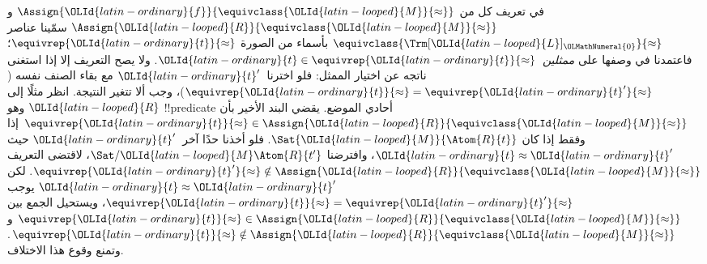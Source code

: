 \documentclass[../../../include/open-logic-section]{subfiles}
\begin{document}
\begin{explain}
في تعريف كل من $\Assign{\OLId{latin-ordinary}{f}}{\equivclass{\OLId{latin-looped}{M}}{\approx}}$ و
$\Assign{\OLId{latin-looped}{R}}{\equivclass{\OLId{latin-looped}{M}}{\approx}}$ سمّينا عناصر
$\equivclass{\Trm[\OLId{latin-looped}{L}]_\OLMathNumeral{0}}{\approx}$ بأسماء من الصورة
$\equivrep{\OLId{latin-ordinary}{t}}{\approx}$؛ فاعتمدنا في وصفها على \emph{ممثلين}~$\OLId{latin-ordinary}{t} \in
\equivrep{\OLId{latin-ordinary}{t}}{\approx}$. ولا يصح التعريف إلا إذا استغنى ناتجه عن اختيار
الممثل: فلو اخترنا~$\OLId{latin-ordinary}{t}'$ مع بقاء الصنف نفسه
($\equivrep{\OLId{latin-ordinary}{t}}{\approx} = \equivrep{\OLId{latin-ordinary}{t}'}{\approx}$)، وجب ألا تتغير
النتيجة. انظر مثلًا إلى $\OLId{latin-looped}{R}$ وهو !!{predicate} أحادي الموضع.
يقضي البند الأخير بأن $\equivrep{\OLId{latin-ordinary}{t}}{\approx} \in \Assign{\OLId{latin-looped}{R}}{\equivclass{\OLId{latin-looped}{M}}{\approx}}$
إذا وفقط إذا كان $\Sat{\OLId{latin-looped}{M}}{\Atom{R}{t}}$. فلو أخذنا حدًا آخر~$\OLId{latin-ordinary}{t}'$
حيث $\OLId{latin-ordinary}{t} \approx \OLId{latin-ordinary}{t}'$، وافترضنا $\Sat/{\OLId{latin-looped}{M}}{\Atom{R}{t'}}$، لاقتضى
التعريف $\equivrep{\OLId{latin-ordinary}{t}'}{\approx} \notin \Assign{\OLId{latin-looped}{R}}{\equivclass{\OLId{latin-looped}{M}}{\approx}}$.
لكن $\OLId{latin-ordinary}{t} \approx \OLId{latin-ordinary}{t}'$ يوجب $\equivrep{\OLId{latin-ordinary}{t}}{\approx} =
\equivrep{\OLId{latin-ordinary}{t}'}{\approx}$، ويستحيل الجمع بين
$\equivrep{\OLId{latin-ordinary}{t}}{\approx} \in \Assign{\OLId{latin-looped}{R}}{\equivclass{\OLId{latin-looped}{M}}{\approx}}$ و
$\equivrep{\OLId{latin-ordinary}{t}}{\approx} \notin \Assign{\OLId{latin-looped}{R}}{\equivclass{\OLId{latin-looped}{M}}{\approx}}$.
وتمنع  وقوع هذا الاختلاف.
\end{explain}
\end{document}
